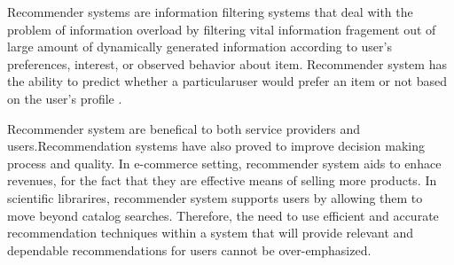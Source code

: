 Recommender systems are information filtering systems that deal with the problem of information overload by filtering vital information fragement out of large amount of dynamically generated information according to user's preferences, interest, or observed behavior about item. Recommender system has the ability to predict whether a particularuser would prefer an item or not based on the user's profile \cite{rmain}.

Recommender system are benefical to both service providers and users.Recommendation systems have also proved to improve decision making process and quality. In e-commerce setting, recommender system aids to enhace revenues, for the fact that they are effective means of selling more products. In scientific librarires, recommender system supports users by allowing them to move beyond catalog searches. Therefore, the need to use efficient and accurate recommendation techniques within a system that will provide relevant and dependable recommendations for users cannot be over-emphasized.

